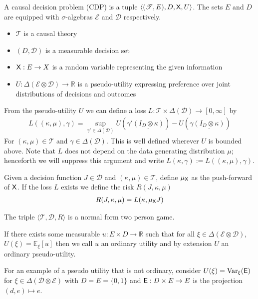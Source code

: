 \begin{definition}\label{def:CDP}
A causal decision problem (CDP) is a tuple $\langle (\mathscr{T}, E), D, \mathsf{X}, U \rangle$. The sets $E$ and $D$ are equipped with $\sigma$-algebras $\mathcal{E}$ and $\mathcal{D}$ respectively.

\begin{itemize}
    \item $\mathscr{T}$ is a causal theory
    \item $(D,\mathcal{D})$ is a measurable decision set
    \item $\mathsf{X}:E\to X$ is a random variable representing the given information
    \item $U:\Delta(\mathcal{E}\otimes \mathcal{D})\to \mathbb{R}$ is a pseudo-utility expressing preference over joint distributions of decisions and outcomes
\end{itemize}

From the pseudo-utility $U$ we can define a loss $L:\mathscr{T}\times\Delta(\mathcal{D})\to [0,\infty]$ by
\begin{align}
    L((\kappa,\mu),\gamma) = \sup_{\gamma'\in\Delta(\mathcal{D})} U(\gamma'\underline{(I_D\otimes \kappa)}) - U(\gamma\underline{(I_D\otimes \kappa)})\label{eq:canonical_loss}
\end{align}
For $(\kappa,\mu)\in \mathscr{T}$ and $\gamma\in \Delta(\mathcal{D})$. This is well defined wherever $U$ is bounded above. Note that $L$ does not depend on the data generating distribution $\mu$; henceforth we will suppress this argument and write $L(\kappa,\gamma):= L((\kappa,\mu),\gamma)$.

Given a decision function $J\in\mathscr{D}$ and $(\kappa,\mu)\in \mathscr{T}$, define $\mu_{\mathsf{X}}$ as the push-forward of $\mathsf{X}$. If the loss $L$ exists we define the risk $R(J,\kappa,\mu)$
\begin{align}
    R(J,\kappa,\mu) = L(\kappa,\mu_{\mathsf{X}} J) 
\end{align}

The triple $\langle \mathscr{T}, \mathscr{D}, R\rangle$ is a normal form two person game.

If there exists some measurable $u:E\times D\to \mathbb{R}$ such that for all $\xi\in \Delta(\mathcal{E}\otimes\mathcal{D})$, $U(\xi)=\mathbb{E}_{\xi}[u]$ then we call $u$ an ordinary utility and by extension $U$ an ordinary pseudo-utility.

For an example of a pseudo utility that is not ordinary, consider $U(\xi) = \text{Var}_{\xi}(\mathsf{E})$ for $\xi\in\Delta(\mathcal{D}\otimes\mathcal{E})$ with $D=E=\{0,1\}$ and $\mathsf{E}:D\times E\to E$ is the projection $(d,e)\mapsto e$.


\end{definition}
